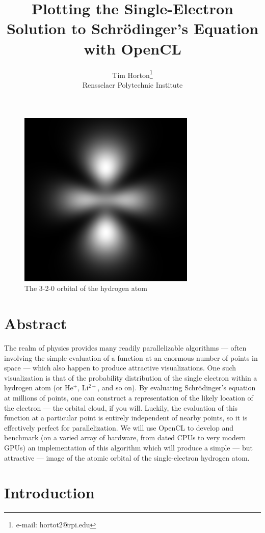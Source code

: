 \documentclass{acmsiggraph}
\title{Plotting the Single-Electron Solution to Schr\"{o}dinger's Equation with OpenCL}
\author{Tim Horton\thanks{e-mail: hortot2@rpi.edu}\\Rensselaer Polytechnic Institute}
\begin{document}
\maketitle

\begin{figure}
    \includegraphics[width=84.5mm]{320.png}
    \caption{The 3-2-0 orbital of the hydrogen atom}
\end{figure}

\section{Abstract}

The realm of physics provides many readily parallelizable algorithms --- often involving the simple evaluation of a function at an enormous number of points in space --- which also happen to produce attractive visualizations. One such visualization is that of the probability distribution of the single electron within a hydrogen atom (or He$^+$, Li$^{2+}$, and so on). By evaluating Schr\"{o}dinger's equation at millions of points, one can construct a representation of the likely location of the electron --- the orbital cloud, if you will. Luckily, the evaluation of this function at a particular point is entirely independent of nearby points, so it is effectively perfect for parallelization. We will use OpenCL to develop and benchmark (on a varied array of hardware, from dated CPUs to very modern GPUs) an implementation of this algorithm which will produce a simple --- but attractive --- image of the atomic orbital of the single-electron hydrogen atom.

\section{Introduction}
\end{document}

